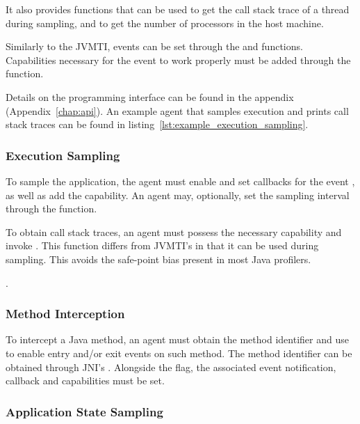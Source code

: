 It also provides functions that can be used to get the call stack trace of a thread during sampling, and to get the number of processors in the host machine.

Similarly to the JVMTI, events can be set through the  and  functions. Capabilities necessary for the event to work properly must be added through the  function.

Details on the programming interface can be found in the appendix (Appendix~\ref{chap:api}). An example agent that samples execution and prints call stack traces can be found in listing~\ref{lst:example_execution_sampling}.

\subsubsection*{Execution Sampling}

To sample the application, the agent must enable and set callbacks for the event , as well as add the  capability. An agent may, optionally, set the sampling interval through the  function.


To obtain call stack traces, an agent must possess the necessary capability and invoke . This function differs from JVMTI's  in that it can be used during sampling. This avoids the safe-point bias present in most Java profilers.


.

\subsubsection*{Method Interception}

To intercept a Java method, an agent must obtain the method identifier and use  to enable entry and/or exit events on such method. The method identifier can be obtained through JNI's . Alongside the flag, the associated event notification, callback and capabilities must be set.

\subsubsection*{Application State Sampling}

